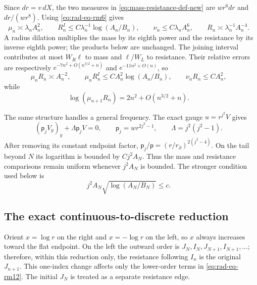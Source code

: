 Since $dr=v\,dX$, the two measures in
\eqref{eq:mass-resistance-def-new} are $wr^6dr$ and $dr/(wr^8)$.
Using \eqref{eq:rad-eq-rm6} gives
\begin{equation}\label{eq:rad-eq-rm10}
 \mu_n\asymp\lambda_nA_n^2,\qquad
 R_n^I\le C\lambda_n^{-1}\log(A_n/B_n),\qquad
 \nu_n\le C\lambda_nA_n^6,\qquad
 R_n\asymp\lambda_n^{-1}A_n^{-4}.
\end{equation}
A radius dilation multiplies the mass by its eighth power and the
resistance by its inverse eighth power; the products below are unchanged.
The joining interval contributes at most $W_R\ell$ to mass and
$\ell/W_L$ to resistance.  Their relative errors are respectively
$e^{-7n^2+O(n^{3/2}+n)}$ and $e^{-11n^2+O(n)}$, so
\begin{equation}\label{eq:rad-eq-rm11}
 \mu_nR_n\asymp A_n^{-2},\qquad
 \mu_nR_n^I\le CA_n^2\log(A_n/B_n),\qquad
 \nu_nR_n\le CA_n^2,
\end{equation}
while
\begin{equation}\label{eq:rad-eq-rm12}
 \log(\mu_{n+1}R_n)=2n^2+O(n^{3/2}+n).
\end{equation}

The same structure handles a general frequency.  The exact gauge
$u=r^{j^2}V$ gives
\begin{equation}\label{eq:rad-eq-rm13}
 (\mathsf p_jV_y)_y+\Lambda\mathsf p_jV=0,
 \qquad \mathsf p_j=wr^{2j^2-1},\qquad \Lambda=j^2(j^2-1).
\end{equation}
After removing its constant endpoint factor,
$\mathsf p_j/\mathsf p=(r/r_\partial)^{2(j^2-4)}$.
On the tail beyond $N$ its logarithm is bounded by $Cj^2A_N$.
Thus the mass and resistance comparisons remain uniform whenever
$j^2A_N$ is bounded.  The stronger condition used below is
\begin{equation}\label{eq:deep-frequency-condition-new}
 j^2A_N\sqrt{\log(A_N/B_N)}\le c.
\end{equation}

\subsection{The exact continuous-to-discrete reduction}

Orient $x=\log r$ on the right and $x=-\log r$ on the left, so $x$
always increases toward the flat endpoint.  On the left the outward
order is $J_N,I_N,J_{N+1},I_{N+1},\ldots$; therefore, within this
reduction only, the resistance following $I_n$ is the original
$J_{n+1}$.  This one-index change affects only the lower-order terms
in \eqref{eq:rad-eq-rm12}.  The initial $J_N$ is treated as a separate
resistance edge.

